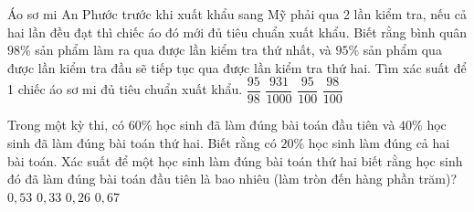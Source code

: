 \begin{ex}
	Áo sơ mi An Phước trước khi xuất khẩu sang Mỹ phải qua 2 lần kiểm tra, nếu cả hai lần đều đạt thì chiếc áo đó mới đủ tiêu chuẩn xuất khẩu. Biết rằng bình quân $98 \%$ sản phẩm làm ra qua được lần kiểm tra thứ nhất, và $95 \%$ sản phẩm qua được lần kiểm tra đầu sẽ tiếp tục qua được lần kiểm tra thứ hai. Tìm xác suất để 1 chiếc áo sơ mi đủ tiêu chuẩn xuất khẩu.
	\choice
	{$\dfrac{95}{98}$}
	{\True $\dfrac{931}{1000}$}
	{$\dfrac{95}{100}$}
	{$\dfrac{98}{100}$}
\end{ex} 

\begin{ex}
	Trong một kỳ thi, có $60 \%$ học sinh đã làm đúng bài toán đầu tiên và $40 \%$ học sinh đã làm đúng bài toán thứ hai. Biết rằng có $20 \%$ học sinh làm đúng cả hai bài toán. Xác suất để một học sinh làm đúng bài toán thứ hai biết rằng học sinh đó đã làm đúng bài toán đầu tiên là bao nhiêu (làm tròn đến hàng phần trăm)?
	\choice
	{$0,53$}
	{$0,33$}
	{$0,26$}
	{$0,67$}
\end{ex} 


